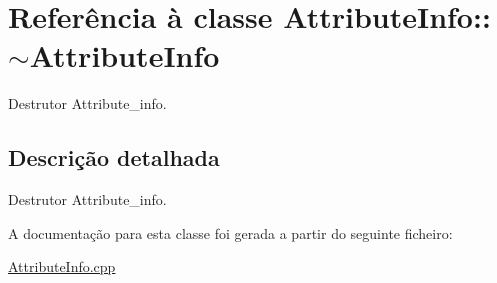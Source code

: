\hypertarget{class_attribute_info_1_1~_attribute_info}{}\section{Referência à classe Attribute\+Info\+:\+:$\sim$\+Attribute\+Info}
\label{class_attribute_info_1_1~_attribute_info}


Destrutor Attribute\+\_\+info.  




\subsection{Descrição detalhada}
Destrutor Attribute\+\_\+info. 

A documentação para esta classe foi gerada a partir do seguinte ficheiro\+:\begin{DoxyCompactItemize}
\item 
\hyperlink{_attribute_info_8cpp}{Attribute\+Info.\+cpp}\end{DoxyCompactItemize}

